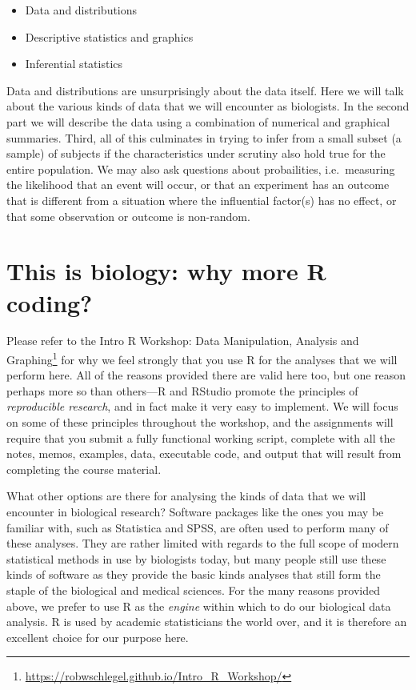 \documentclass[english,10pt,a4paper,oneside]{book}
\renewcommand{\href}[2]{#2\footnote{\url{#1}}}
\let\rmarkdownfootnote\footnote%
\def\footnote{\protect\rmarkdownfootnote}
\providecommand{\tightlist}{%
  \setlength{\itemsep}{0pt}\setlength{\parskip}{0pt}}
\theoremstyle{definition}
\theoremstyle{definition}
\theoremstyle{definition}
\theoremstyle{remark}
\begin{document}
\begin{itemize}
\tightlist
\item
  Data and distributions
\item
  Descriptive statistics and graphics
\item
  Inferential statistics
\end{itemize}

Data and distributions are unsurprisingly about the data itself. Here we
will talk about the various kinds of data that we will encounter as
biologists. In the second part we will describe the data using a
combination of numerical and graphical summaries. Third, all of this
culminates in trying to infer from a small subset (a sample) of subjects
if the characteristics under scrutiny also hold true for the entire
population. We may also ask questions about probailities, i.e.~measuring
the likelihood that an event will occur, or that an experiment has an
outcome that is different from a situation where the influential
factor(s) has no effect, or that some observation or outcome is
non-random.

\hypertarget{this-is-biology-why-more-r-coding}{%
\section{This is biology: why more R
coding?}\label{this-is-biology-why-more-r-coding}}

Please refer to the
\href{https://robwschlegel.github.io/Intro_R_Workshop/}{Intro R
Workshop: Data Manipulation, Analysis and Graphing} for why we feel
strongly that you use R \citep{R2017} for the analyses that we will
perform here. All of the reasons provided there are valid here too, but
one reason perhaps more so than others---R and RStudio promote the
principles of \emph{reproducible research}, and in fact make it very
easy to implement. We will focus on some of these principles throughout
the workshop, and the assignments will require that you submit a fully
functional working script, complete with all the notes, memos, examples,
data, executable code, and output that will result from completing the
course material.

What other options are there for analysing the kinds of data that we
will encounter in biological research? Software packages like the ones
you may be familiar with, such as Statistica and SPSS, are often used to
perform many of these analyses. They are rather limited with regards to
the full scope of modern statistical methods in use by biologists today,
but many people still use these kinds of software as they provide the
basic kinds analyses that still form the staple of the biological and
medical sciences. For the many reasons provided above, we prefer to use
R as the \emph{engine} within which to do our biological data analysis.
R is used by academic statisticians the world over, and it is therefore
an excellent choice for our purpose here.
\end{document}
